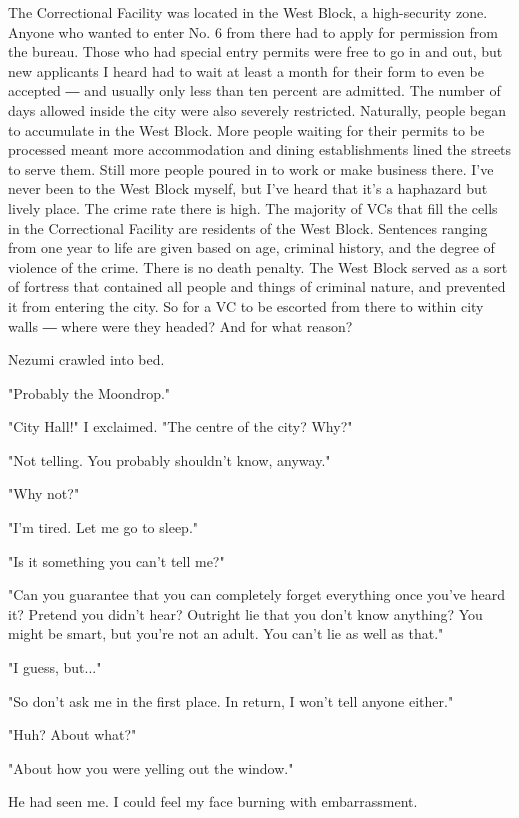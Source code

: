 The Correctional Facility was located in the West Block, a high-security
zone. Anyone who wanted to enter No. 6 from there had to apply for
permission from the bureau. Those who had special entry permits were
free to go in and out, but new applicants I heard had to wait at least a
month for their form to even be accepted ― and usually only less than
ten percent are admitted. The number of days allowed inside the city
were also severely restricted. Naturally, people began to accumulate in
the West Block. More people waiting for their permits to be processed
meant more accommodation and dining establishments lined the streets to
serve them. Still more people poured in to work or make business there.
I've never been to the West Block myself, but I've heard that it's a
haphazard but lively place. The crime rate there is high. The majority
of VCs that fill the cells in the Correctional Facility are residents of
the West Block. Sentences ranging from one year to life are given based
on age, criminal history, and the degree of violence of the crime. There
is no death penalty. The West Block served as a sort of fortress that
contained all people and things of criminal nature, and prevented it
from entering the city. So for a VC to be escorted from there to within
city walls ― where were they headed? And for what reason?

Nezumi crawled into bed.

"Probably the Moondrop."

"City Hall!" I exclaimed. "The centre of the city? Why?"

"Not telling. You probably shouldn't know, anyway."

"Why not?"

"I'm tired. Let me go to sleep."

"Is it something you can't tell me?"

"Can you guarantee that you can completely forget everything once you've
heard it? Pretend you didn't hear? Outright lie that you don't know
anything? You might be smart, but you're not an adult. You can't lie as
well as that."

"I guess, but..."

"So don't ask me in the first place. In return, I won't tell anyone
either."

"Huh? About what?"

"About how you were yelling out the window."

He had seen me. I could feel my face burning with embarrassment.

